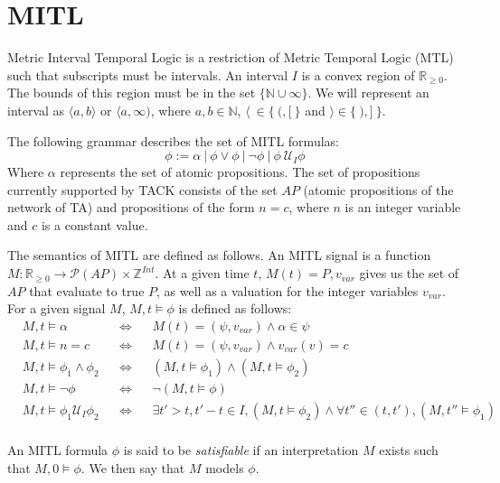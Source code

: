 \documentclass[a4paper,11pt]{report}
\theoremstyle{definition}
\begin{document}
\section{MITL}\label{mitl}

Metric Interval Temporal Logic is a restriction of Metric Temporal Logic (MTL)
such that subscripts must be intervals\cite{bouyer09}. An interval $I$ is a
convex region of $\mathbb{R}_{\geq 0}$. The bounds of this region must be in the
set $\{\mathbb{N} \cup \infty\}$. We will represent an interval as
$\langle a,b \rangle$ or $\langle a,\infty )$, where $a,b \in \mathbb{N}$,
$\langle\ \in \{\ (,[\ \}$ and $\rangle \in \{\ ),]\ \}$.

The following grammar describes the set of MITL formulas:
\[\phi := \alpha\ |\ \phi \lor \phi\ |\ \neg \phi\ |\ \phi\ \mathcal{U}_{I} \phi\]
Where $\alpha$ represents the set of atomic propositions. The set of
propositions currently supported by TACK consists of the set $AP$ (atomic
propositions of the network of TA) and propositions of the form $n = c$, where
$n$ is an integer variable and $c$ is a constant value.

The semantics of MITL are defined as follows. An MITL signal is a function
$M : \mathbb{R}_{\geq 0} \rightarrow \mathcal{P}(AP) \times \mathbb{Z}^{Int}$.
At a given time $t$, $M(t) = P, v_{var}$ gives us the set of $AP$ that evaluate
to true $P$, as well as a valuation for the integer variables $v_{var}$. For a
given signal $M$, $M,t \vDash \phi$ is defined as follows:
\begin{align*}
  &M,t \vDash \alpha && \Leftrightarrow && M(t) = (\psi,v_{var}) \land \alpha \in \psi \\
  &M,t \vDash n = c && \Leftrightarrow && M(t) = (\psi,v_{var}) \land v_{var}(v) = c \\
  &M,t \vDash \phi_{1} \land \phi_{2} && \Leftrightarrow && (M,t \vDash \phi_{1}) \land (M,t \vDash \phi_{2}) \\
  &M,t \vDash \neg \phi && \Leftrightarrow && \neg (M,t \vDash \phi) \\
  &M,t \vDash \phi_{1} \mathcal{U}_{I} \phi_{2} && \Leftrightarrow && \exists t' > t, t' - t \in I, (M,t \vDash \phi_{2}) \land \forall t'' \in (t,t'), (M,t'' \vDash \phi_{1}) \\
\end{align*}

An MITL formula $\phi$ is said to be \emph{satisfiable} if an interpretation
$M$ exists such that $M,0 \vDash \phi$. We then say that $M$ models $\phi$.
\end{document}
